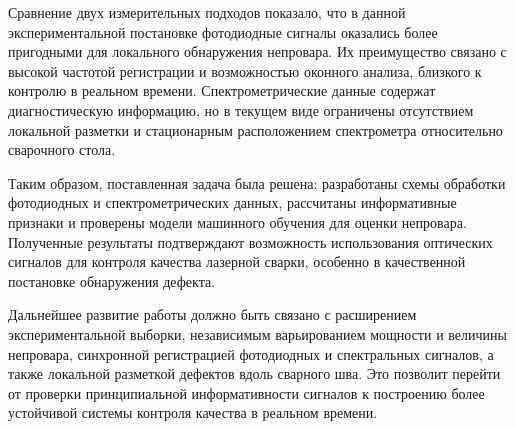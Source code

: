 Сравнение двух измерительных подходов показало, что в данной экспериментальной постановке фотодиодные сигналы оказались более пригодными для локального обнаружения непровара. Их преимущество связано с высокой частотой регистрации и возможностью оконного анализа, близкого к контролю в реальном времени. Спектрометрические данные содержат диагностическую информацию, но в текущем виде ограничены отсутствием локальной разметки и стационарным расположением спектрометра относительно сварочного стола.

Таким образом, поставленная задача была решена: разработаны схемы обработки фотодиодных и спектрометрических данных, рассчитаны информативные признаки и проверены модели машинного обучения для оценки непровара. Полученные результаты подтверждают возможность использования оптических сигналов для контроля качества лазерной сварки, особенно в качественной постановке обнаружения дефекта.

Дальнейшее развитие работы должно быть связано с расширением экспериментальной выборки, независимым варьированием мощности и величины непровара, синхронной регистрацией фотодиодных и спектральных сигналов, а также локальной разметкой дефектов вдоль сварного шва. Это позволит перейти от проверки принципиальной информативности сигналов к построению более устойчивой системы контроля качества в реальном времени.

\endinput